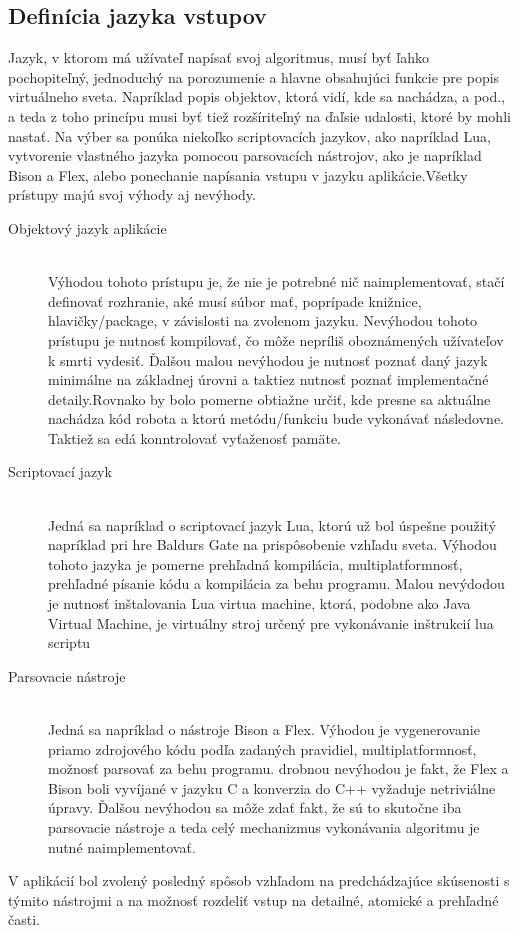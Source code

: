 \subsection{ Definícia jazyka vstupov }
Jazyk, v ktorom má užívateľ napísať svoj algoritmus, musí byť ľahko pochopiteľný, jednoduchý na porozumenie a hlavne obsahujúci funkcie pre popis virtuálneho sveta. Napríklad popis objektov, ktorá vidí, kde sa nachádza, a pod., a teda z toho princípu musi byť tiež rozšíriteľný na ďaľsie udalosti, ktoré by mohli nastať. Na výber sa ponúka niekoľko scriptovacích jazykov, ako napríklad Lua, vytvorenie vlastného jazyka pomocou parsovacích nástrojov, ako je napríklad Bison a Flex, alebo ponechanie napísania vstupu v jazyku aplikácie.Všetky prístupy majú svoj výhody aj nevýhody.
\begin{description}
	\item[Objektový jazyk aplikácie]\hfill \\ Výhodou tohoto prístupu je, že nie je potrebné nič naimplementovať, stačí definovať rozhranie, aké musí súbor mať, poprípade knižnice, hlavičky/package, v závislosti na zvolenom jazyku. Nevýhodou tohoto prístupu je nutnosť kompilovať, čo môže nepríliš oboznámených užívateľov k smrti vydesiť. Ďalšou malou nevýhodou je nutnosť poznať daný jazyk minimálne na základnej úrovni a taktiez nutnosť poznať implementačné detaily.Rovnako by bolo pomerne obtiažne určiť, kde presne sa aktuálne nachádza kód robota a ktorú metódu/funkciu bude vykonávať následovne. Taktiež sa edá konntrolovať vyťaženosť pamäte.
	\item[Scriptovací jazyk]\hfill \\ Jedná sa napríklad o scriptovací jazyk Lua, ktorú už bol úspešne použitý napríklad pri hre Baldurs Gate na prispôsobenie vzhľadu sveta. Výhodou tohoto jazyka je pomerne prehľadná kompilácia, multiplatformnosť, prehľadné písanie kódu a kompilácia za behu programu. Malou nevýdodou je nutnosť inštalovania Lua virtua machine, ktorá, podobne ako Java Virtual Machine, je virtuálny stroj určený pre vykonávanie inštrukcií lua scriptu
	\item[Parsovacie nástroje]\hfill \\ Jedná sa napríklad o nástroje Bison a Flex. Výhodou je vygenerovanie priamo zdrojového kódu podľa zadaných pravidiel, multiplatformnosť, možnosť parsovať za behu programu. drobnou nevýhodou je fakt, že Flex a Bison boli vyvíjané v jazyku C a konverzia do C++ vyžaduje netriviálne úpravy. Ďalšou nevýhodou sa môže zdať fakt, že sú to skutočne iba parsovacie nástroje a teda celý mechanizmus vykonávania algoritmu je nutné naimplementovať.
\end{description}
V aplikácií bol zvolený posledný spôsob vzhľadom na predchádzajúce skúsenosti s týmito nástrojmi a na možnosť rozdeliť vstup na detailné, atomické a prehľadné časti.

